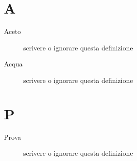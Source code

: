 \documentclass[a4paper, oneside]{article}
\begin{document}
\copertina{}


\newpage
\newpage
\tableofcontents

\newpage

\section{A}
\begin{description}
  \item[Aceto] {scrivere o ignorare questa definizione}
  \item[Acqua] {scrivere o ignorare questa definizione}
\end{description}
\newpage
\section{P}
\begin{description}
  \item[Prova] {scrivere o ignorare questa definizione}
\end{description}
\newpage
\end{document}
